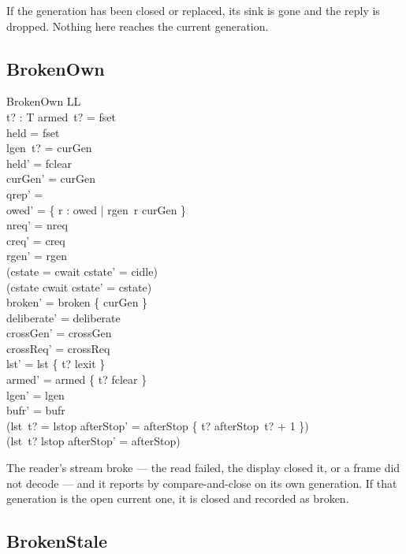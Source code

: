 \documentclass[a4paper,10pt,fleqn]{article}
\begin{document}
If the generation has been closed or replaced, its sink is gone and the reply is dropped.  Nothing here reaches the current generation.

\subsection{BrokenOwn}

\begin{schema}{BrokenOwn}
  \Delta LL \\
  t? : T
\where
  armed~t? = fset \\
  held = fset \\
  lgen~t? = curGen \\
  held' = fclear \\
  curGen' = curGen \\
  qrep' = \emptyset \\
  owed' = \{ r : owed | rgen~r \neq curGen \} \\
  nreq' = nreq \\
  creq' = creq \\
  rgen' = rgen \\
  (cstate = cwait \implies cstate' = cidle) \\
  (cstate \neq cwait \implies cstate' = cstate) \\
  broken' = broken \cup \{ curGen \} \\
  deliberate' = deliberate \\
  crossGen' = crossGen \\
  crossReq' = crossReq \\
  lst' = lst \oplus \{ t? \mapsto lexit \} \\
  armed' = armed \oplus \{ t? \mapsto fclear \} \\
  lgen' = lgen \\
  bufr' = bufr \\
  (lst~t? = lstop \implies
    afterStop' = afterStop \oplus \{ t? \mapsto afterStop~t? + 1 \}) \\
  (lst~t? \neq lstop \implies afterStop' = afterStop)
\end{schema}

The reader's stream broke --- the read failed, the display closed it, or a frame did not decode --- and it reports by compare-and-close on its own generation.  If that generation is the open current one, it is closed and recorded as broken.

\subsection{BrokenStale}
\end{document}

